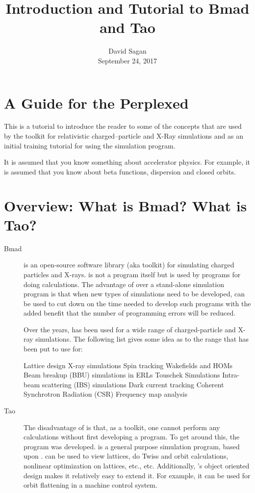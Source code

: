 \documentclass{hitec}
\title{Introduction and Tutorial to Bmad and Tao}
\author{}
\date{David Sagan \\ September 24, 2017}
\newcommand{\Section}[1]{\section{#1}\vspace*{-1ex}}
\begin{document}
\maketitle

\tableofcontents

\Section{A Guide for the Perplexed}
\label{s:guide}

This is a tutorial to introduce the reader to some of the concepts that are used by the \bmad toolkit
for relativistic charged--particle and X-Ray simulations and as an initial training tutorial
for using the \tao simulation program.

It is assumed that you know something about accelerator physics. For example, it is assumed that
you know about beta functions, dispersion and closed orbits.

\Section{Overview: What is Bmad? What is Tao?}
\label{s:overview}

  \begin{description}
  \item[Bmad] \Newline
\bmad is an open-source software library (aka toolkit) for simulating charged particles
and X-rays. \bmad is not a program itself but is used by programs for doing
calculations. 
The advantage of \bmad over a stand-alone simulation program is that when new types of simulations
need to be developed, \bmad can be used to cut down on the time needed to develop such programs
with the added benefit that the number of programming errors will be reduced.

Over the years, \bmad has been used for a wide range of charged-particle and X-ray
simulations. The following list gives some idea as to the range that \bmad has been put to use
for:
\begin{code}
Lattice design                                  X-ray simulations
Spin tracking                                   Wakefields and HOMs
Beam breakup (BBU) simulations in ERLs          Touschek Simulations
Intra-beam scattering (IBS) simulations         Dark current tracking
Coherent Synchrotron Radiation (CSR)            Frequency map analysis
\end{code}

  \item[Tao] \Newline
The disadvantage of \bmad is that, as a toolkit, one cannot perform any calculations
without first developing a program. To get around this, the \tao program was developed.
\tao is a general purpose simulation program, based upon \bmad. \tao can be used to view
lattices, do Twiss and orbit calculations, nonlinear optimization on lattices, etc., etc.
Additionally, \tao's object oriented design makes it relatively easy to extend it. For
example, it can be used for orbit flattening in a machine control system.
  \end{description}
\end{document}
